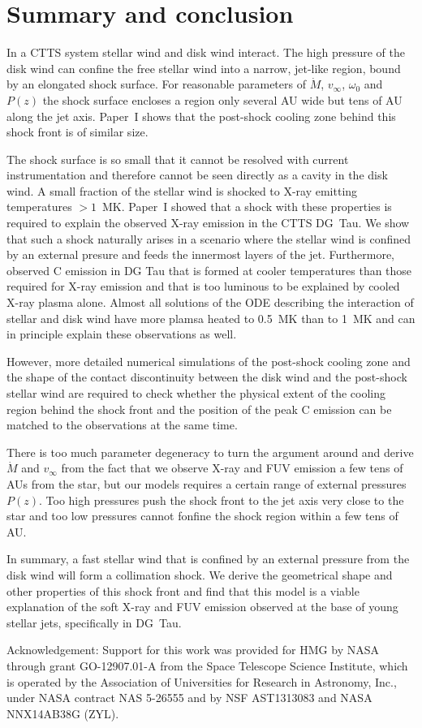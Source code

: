 \section{Summary and conclusion}
\label{sect:conclusion}
In a CTTS system stellar wind and disk wind interact. The high pressure of the disk wind can confine the free stellar wind into a narrow, jet-like region, bound by an elongated shock surface. For reasonable parameters of $\dot M$, $v_\infty$, $\omega_0$ and $P(z)$ the shock surface encloses a region only several AU wide but tens of AU along the jet axis. 
Paper~I shows that the post-shock cooling zone behind this shock front is of similar size.
 
The shock surface is so small that it cannot be resolved with current instrumentation and therefore cannot be seen directly as a cavity in the disk wind. A small fraction of the stellar wind is shocked to X-ray emitting temperatures $>1$~MK. 
Paper~I showed that a shock with these properties is required to explain the observed X-ray emission in the CTTS DG~Tau. We show that such a shock naturally arises in a scenario where the stellar wind is confined by an external presure and feeds the innermost layers of the jet.
Furthermore, \citet{2013A&A...550L...1S} observed C emission in DG Tau that is formed at cooler temperatures than those required for X-ray emission and that is too luminous to be explained by cooled X-ray plasma alone. Almost all solutions of the ODE describing the interaction of stellar and disk wind have more plamsa heated to 0.5~MK than to 1~MK and can in principle explain these observations as well.

However, more detailed numerical simulations of the post-shock cooling zone and the shape of the contact discontinuity between the disk wind and the post-shock stellar wind are required to check whether the physical extent of the cooling region behind the shock front and the position of the peak  C emission can be matched to the observations at the same time.

There is too much parameter degeneracy to turn the argument around and derive $\dot M$ and  $v_\infty$ from the fact that we observe X-ray and FUV emission a few tens of AUs from the star, but our models requires a certain range of external pressures $P(z)$. Too high pressures push the shock front to the jet axis very close to the star and too low pressures cannot fonfine the shock region within a few tens of AU.

In summary, a fast stellar wind that is confined by an external pressure from the disk wind will form a collimation shock. We derive the geometrical shape and other properties of this shock front and find that this model is a viable explanation of the soft X-ray and FUV emission observed at the base of young stellar jets, specifically in DG~Tau.

Acknowledgement: Support for this work was provided for HMG by NASA through grant GO-12907.01-A from the Space Telescope Science Institute, which is operated by the Association of Universities for Research in Astronomy, Inc., under NASA contract NAS 5-26555 and by NSF AST1313083 and NASA NNX14AB38G (ZYL).